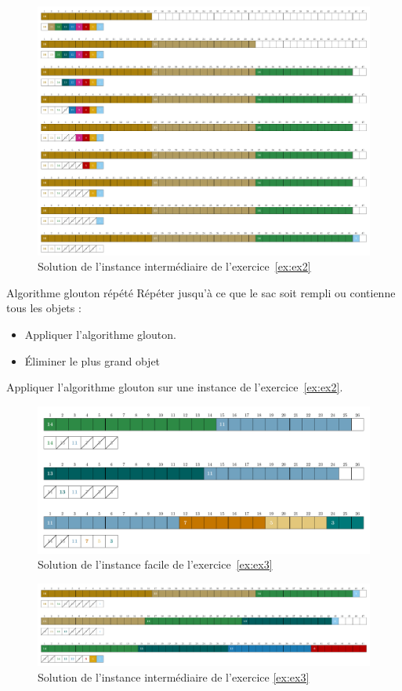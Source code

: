 \documentclass[11pt]{article}
\begin{document}
  \begin{figure}[htbp]
    \centering
    \includegraphics[width=0.6\linewidth]{ex2-9-GS.pdf}
    \caption{Solution de l'instance intermédiaire de l'exercice~\ref{ex:ex2}}
  \end{figure}


  \begin{algorithme}{Algorithme glouton répété}
     \label{ex:ex3}
    Répéter jusqu'à ce que le sac soit rempli ou contienne tous les objets :
    \begin{itemize}
    \item Appliquer l'algorithme glouton.
    \item Éliminer le plus grand objet
    \end{itemize}
  \end{algorithme}

  \begin{exercice}{}
    Appliquer l'algorithme glouton sur une instance de l'exercice~\ref{ex:ex2}.
  \end{exercice}
 \begin{figure}[htbp]
    \centering
    \includegraphics[width=0.6\linewidth]{ex2-6-MTGS.pdf}
    \caption{Solution de l'instance facile de l'exercice~\ref{ex:ex3}}
  \end{figure}

  \begin{figure}[htbp]
    \centering
    \includegraphics[width=0.6\linewidth]{ex2-9-MTGS.pdf}
    \caption{Solution de l'instance intermédiaire de l'exercice \ref{ex:ex3}}
  \end{figure}
\end{document}
